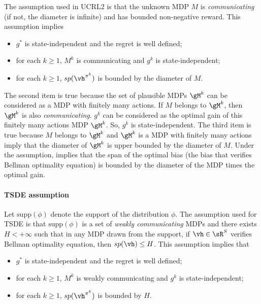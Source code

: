 The assumption used in UCRL2 is that the unknown MDP $M$ is \emph{communicating} (if not, the diameter is infinite) and has bounded non-negative reward.
This assumption implies
\begin{itemize}
    \item $g^*$ is state-independent and the regret is well defined;
    \item for each $k\ge1$, $M^k$ is communicating and $g^k$ is state-independent;
    \item for each $k\ge1$, $sp(\vh^{\pi^k})$ is bounded by the diameter of $M$.
\end{itemize}
The second item is true because the set of plausible MDPs $\gM^k$ can be considered as a MDP with finitely many actions.
If $M$ belongs to $\gM^k$, then $\gM^k$ is also \emph{communicating}.
$g^k$ can be considered as the optimal gain of this finitely many actions MDP $\gM^k$.
So, $g^k$ is state-independent.
The third item is true because $M$ belongs to $\gM^k$ and $\gM^k$ is a MDP with finitely many actions imply that the diameter of $\gM^k$ is upper bounded by the diameter of $M$.
Under the assumption, \cite[Theorem~4]{bartlett2012regal} implies that the span of the optimal bias (the bias that verifies Bellman optimality equation) is bounded by the diameter of the MDP times the optimal gain.


\paragraph{TSDE assumption}

Let $\mathrm{supp}(\phi)$ denote the support of the distribution $\phi$.
The assumption used for TSDE is that $\mathrm{supp}(\phi)$ is a set of \emph{weakly communicating} MDPs and there exists $H<+\infty$ such that in any MDP drawn from the support, if $\vh\in\sR^S$ verifies Bellman optimality equation, then $sp(\vh)\le H$.
This assumption implies that
\begin{itemize}
    \item $g^*$ is state-independent and the regret is well defined;
    \item for each $k\ge1$, $M^k$ is weakly communicating and $g^k$ is state-independent;
    \item for each $k\ge1$, $sp(\vh^{\pi^k})$ is bounded by $H$.
\end{itemize}


